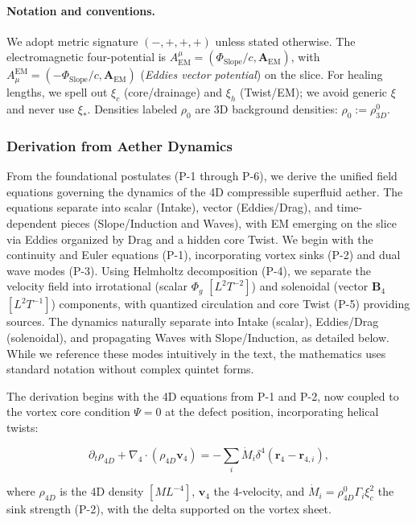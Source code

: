 \paragraph{Notation and conventions.}
We adopt metric signature $(-,+,+,+)$ unless stated otherwise.
The electromagnetic four-potential is $A^\mu_{\text{EM}}=(\Phi_{\text{Slope}}/c,\mathbf A_{\text{EM}})$, with $A_{\mu}^{\text{EM}} = (-\Phi_{\text{Slope}}/c,\mathbf A_{\text{EM}})$ (\emph{Eddies vector potential}) on the slice. For healing lengths, we spell out $\xi_c$ (core/drainage) and $\xi_h$ (Twist/EM); we avoid generic $\xi$ and never use $\xi_*$. Densities labeled $\rho_0$ are 3D background densities: $\rho_0 := \rho_{3D}^0$.

\subsubsection{Derivation from Aether Dynamics}

From the foundational postulates (P-1 through P-6), we derive the unified field equations governing the dynamics of the 4D compressible superfluid aether. The equations separate into scalar (Intake), vector (Eddies/Drag), and time-dependent pieces (Slope/Induction and Waves), with EM emerging on the slice via Eddies organized by Drag and a hidden core Twist. We begin with the continuity and Euler equations (P-1), incorporating vortex sinks (P-2) and dual wave modes (P-3). Using Helmholtz decomposition (P-4), we separate the velocity field into irrotational (scalar $\Phi_g$ $[L^2 T^{-2}]$) and solenoidal (vector $\mathbf{B}_4$ $[L^2 T^{-1}]$) components, with quantized circulation and core Twist (P-5) providing sources. The dynamics naturally separate into Intake (scalar), Eddies/Drag (solenoidal), and propagating Waves with Slope/Induction, as detailed below. While we reference these modes intuitively in the text, the mathematics uses standard notation without complex quintet forms.

The derivation begins with the 4D equations from P-1 and P-2, now coupled to the vortex core condition $\Psi=0$ at the defect position, incorporating helical twists:

\begin{equation}
\partial_t \rho_{4D} + \nabla_4 \cdot (\rho_{4D} \mathbf{v}_4) = -\sum_i \dot{M}_i \delta^4(\mathbf{r}_4 - \mathbf{r}_{4,i}),
\end{equation}

where $\rho_{4D}$ is the 4D density $[M L^{-4}]$, $\mathbf{v}_4$ the 4-velocity, and $\dot{M}_i = \rho_{4D}^0 \Gamma_i \xi_c^2$ the sink strength (P-2), with the delta supported on the vortex sheet.

